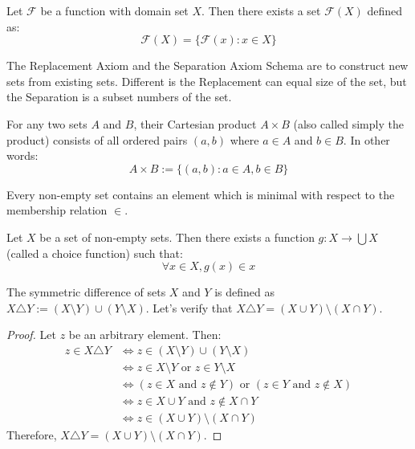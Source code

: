 \begin{axiom}
  Let $\mathcal{F}$ be a function with domain set $X$. Then there exists a set $\mathcal{F}(X)$ defined as:
  \[
    \mathcal{F}(X) = \{\mathcal{F}(x) : x \in X\}
  \]
\end{axiom}

\begin{remark}
  The Replacement Axiom and the Separation Axiom Schema are to construct new sets from existing sets. Different is the Replacement can equal size of the set, but the Separation is a subset numbers of the set.
\end{remark}

\begin{definition}
  For any two sets $A$ and $B$, their Cartesian product $A \times B$ (also called simply the product) consists of all ordered pairs $(a,b)$ where $a \in A$ and $b \in B$. In other words:
  \[
    A \times B := \{(a,b) : a \in A, b \in B\}
  \]
\end{definition}

\begin{axiom}
  Every non-empty set contains an element which is minimal with respect to the membership relation $\in$.
\end{axiom}

\begin{axiom}
  Let $X$ be a set of non-empty sets. Then there exists a function $g : X \to \bigcup X$ (called a choice function) such that:
  \[
    \forall x \in X, g(x) \in x
  \]
\end{axiom}

\begin{example}
  The symmetric difference of sets $X$ and $Y$ is defined as $X \triangle Y := (X \setminus Y) \cup (Y \setminus X)$.
  Let's verify that $X \triangle Y = (X \cup Y) \setminus (X \cap Y)$.

  \begin{proof}
    Let $z$ be an arbitrary element. Then:
    \begin{align*}
      z \in X \triangle Y &\iff z \in (X \setminus Y) \cup (Y \setminus X) \\
      &\iff z \in X \setminus Y \text{ or } z \in Y \setminus X \\
      &\iff (z \in X \text{ and } z \notin Y) \text{ or } (z \in Y \text{ and } z \notin X) \\
      &\iff z \in X \cup Y \text{ and } z \notin X \cap Y \\
      &\iff z \in (X \cup Y) \setminus (X \cap Y)
    \end{align*}
    Therefore, $X \triangle Y = (X \cup Y) \setminus (X \cap Y)$.
  \end{proof}
\end{example}

